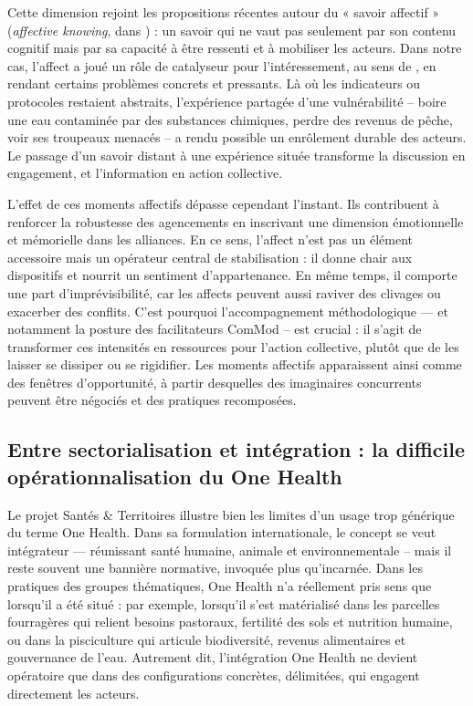 \documentclass{article}
\begin{document}
Cette dimension rejoint les propositions récentes autour du « savoir affectif » (\textit{affective knowing}, dans \textcite{hertz_knowledge_2025}) : un savoir qui ne vaut pas seulement par son contenu cognitif mais par sa capacité à être ressenti et à mobiliser les acteurs. Dans notre cas, l’affect a joué un rôle de catalyseur pour l’intéressement, au sens de \textcite{callon_techno-economic_1990}, en rendant certains problèmes concrets et pressants. Là où les indicateurs ou protocoles restaient abstraits, l’expérience partagée d’une vulnérabilité -- boire une eau contaminée par des substances chimiques, perdre des revenus de pêche, voir ses troupeaux menacés -- a rendu possible un enrôlement durable des acteurs. Le passage d’un savoir distant à une expérience située transforme la discussion en engagement, et l’information en action collective.

L’effet de ces moments affectifs dépasse cependant l’instant. Ils contribuent à renforcer la robustesse des agencements en inscrivant une dimension émotionnelle et mémorielle dans les alliances. En ce sens, l’affect n’est pas un élément accessoire mais un opérateur central de stabilisation : il donne chair aux dispositifs et nourrit un sentiment d’appartenance. En même temps, il comporte une part d’imprévisibilité, car les affects peuvent aussi raviver des clivages ou exacerber des conflits. C’est pourquoi l’accompagnement méthodologique — et notamment la posture des facilitateurs ComMod -- est crucial : il s’agit de transformer ces intensités en ressources pour l’action collective, plutôt que de les laisser se dissiper ou se rigidifier. Les moments affectifs apparaissent ainsi comme des fenêtres d’opportunité, à partir desquelles des imaginaires concurrents peuvent être négociés et des pratiques recomposées.

\subsection{Entre sectorialisation et intégration : la difficile opérationnalisation du One Health}

Le projet Santés \& Territoires illustre bien les limites d’un usage trop générique du terme One Health. Dans sa formulation internationale, le concept se veut intégrateur — réunissant santé humaine, animale et environnementale -- mais il reste souvent une bannière normative, invoquée plus qu’incarnée. Dans les pratiques des groupes thématiques, One Health n’a réellement pris sens que lorsqu’il a été situé : par exemple, lorsqu’il s’est matérialisé dans les parcelles fourragères qui relient besoins pastoraux, fertilité des sols et nutrition humaine, ou dans la pisciculture qui articule biodiversité, revenus alimentaires et gouvernance de l’eau. Autrement dit, l’intégration One Health ne devient opératoire que dans des configurations concrètes, délimitées, qui engagent directement les acteurs.
\end{document}
